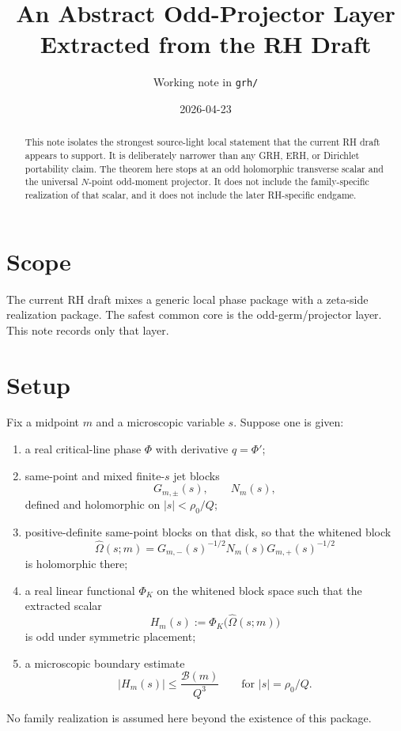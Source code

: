 \documentclass[11pt]{article}
\title{An Abstract Odd-Projector Layer Extracted from the RH Draft}
\author{Working note in \texttt{grh/}}
\date{2026-04-23}
\begin{document}
\maketitle

\begin{abstract}
This note isolates the strongest source-light local statement that the current
RH draft appears to support. It is deliberately narrower than any GRH, ERH, or
Dirichlet portability claim. The theorem here stops at an odd holomorphic
transverse scalar and the universal \(N\)-point odd-moment projector. It does
not include the family-specific realization of that scalar, and it does not
include the later RH-specific endgame.
\end{abstract}

\section{Scope}

The current RH draft mixes a generic local phase package with a zeta-side
realization package. The safest common core is the odd-germ/projector layer.
This note records only that layer.

\section{Setup}

Fix a midpoint \(m\) and a microscopic variable \(s\). Suppose one is given:

\begin{enumerate}
\item a real critical-line phase \(\Phi\) with derivative \(q=\Phi'\);
\item same-point and mixed finite-\(s\) jet blocks
\[
G_{m,\pm}(s),\qquad N_m(s),
\]
defined and holomorphic on \(|s|<\rho_0/Q\);
\item positive-definite same-point blocks on that disk, so that the whitened
block
\[
\widehat\Omega(s;m)=G_{m,-}(s)^{-1/2}N_m(s)G_{m,+}(s)^{-1/2}
\]
is holomorphic there;
\item a real linear functional \(\Phi_K\) on the whitened block space such that
the extracted scalar
\[
H_m(s):=\Phi_K\bigl(\widehat\Omega(s;m)\bigr)
\]
is odd under symmetric placement;
\item a microscopic boundary estimate
\[
|H_m(s)|\le \frac{\mathcal B(m)}{Q^3}
\qquad\text{for } |s|=\rho_0/Q.
\]
\end{enumerate}

No family realization is assumed here beyond the existence of this package.
\end{document}
